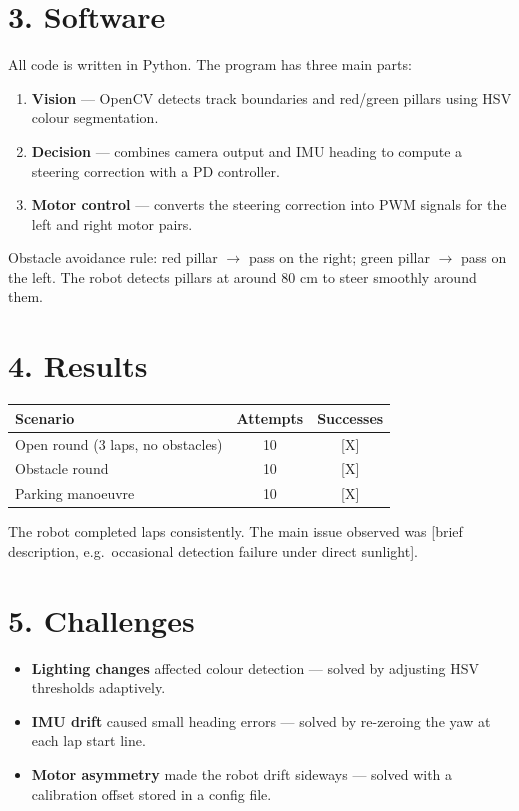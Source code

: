 \documentclass[11pt,a4paper]{article}
\begin{document}
\section*{3. Software}

All code is written in Python. The program has three main parts:

\begin{enumerate}[leftmargin=1.5em, itemsep=2pt]
  \item \textbf{Vision} --- OpenCV detects track boundaries and red/green pillars using HSV colour segmentation.
  \item \textbf{Decision} --- combines camera output and IMU heading to compute a steering correction with a PD controller.
  \item \textbf{Motor control} --- converts the steering correction into PWM signals for the left and right motor pairs.
\end{enumerate}

Obstacle avoidance rule: red pillar $\rightarrow$ pass on the right; green pillar $\rightarrow$ pass on the left.
The robot detects pillars at around 80 cm to steer smoothly around them.

\section*{4. Results}

\begin{center}
\begin{tabular}{lcc}
  \toprule
  Scenario & Attempts & Successes \\
  \midrule
  Open round (3 laps, no obstacles) & 10 & [X] \\
  Obstacle round                    & 10 & [X] \\
  Parking manoeuvre                 & 10 & [X] \\
  \bottomrule
\end{tabular}
\end{center}

The robot completed laps consistently. The main issue observed was [brief description, e.g.\ occasional detection failure under direct sunlight].

\section*{5. Challenges}

\begin{itemize}[leftmargin=1.5em, itemsep=2pt]
  \item \textbf{Lighting changes} affected colour detection --- solved by adjusting HSV thresholds adaptively.
  \item \textbf{IMU drift} caused small heading errors --- solved by re-zeroing the yaw at each lap start line.
  \item \textbf{Motor asymmetry} made the robot drift sideways --- solved with a calibration offset stored in a config file.
\end{itemize}
\end{document}
